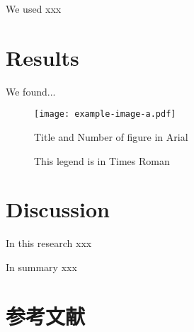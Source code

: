 We used xxx

\section{Results}

We found...

\begin{figure}
    \centering
    \texttt{[image: example-image-a.pdf]}
    \caption{Title and Number of figure in Arial}
    \caption*{This legend is in Times Roman}
    \label{fig:example}
  \end{figure}

\section{Discussion}

In this research xxx

In summary xxx

\section*{参考文献}
{\renewcommand{\bibsection}{}
\putbib
}
